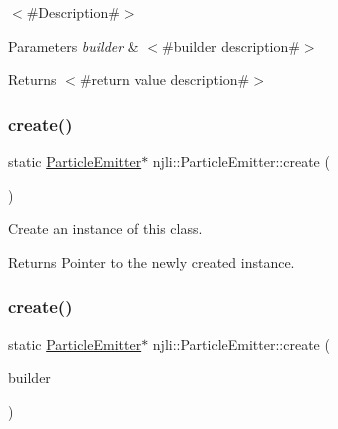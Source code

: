 $<$\#\+Description\#$>$


\begin{DoxyParams}{Parameters}
{\em builder} & $<$\#builder description\#$>$\\
\hline
\end{DoxyParams}
\begin{DoxyReturn}{Returns}
$<$\#return value description\#$>$ 
\end{DoxyReturn}
\mbox{\label{classnjli_1_1_particle_emitter_a08d13d496fe59ef6546eac4e56b3d45f}} 
\subsubsection{\texorpdfstring{create()}{create()}\hspace{0.1cm}{\footnotesize\ttfamily [2/3]}}
{\footnotesize\ttfamily static \mbox{\hyperlink{classnjli_1_1_particle_emitter}{Particle\+Emitter}}$\ast$ njli\+::\+Particle\+Emitter\+::create (\begin{DoxyParamCaption}{ }\end{DoxyParamCaption})\hspace{0.3cm}{\ttfamily [static]}}

Create an instance of this class.

\begin{DoxyReturn}{Returns}
Pointer to the newly created instance. 
\end{DoxyReturn}
\mbox{\label{classnjli_1_1_particle_emitter_a3c0e274cedf2f51c2bcd47a77f03bd0f}} 
\subsubsection{\texorpdfstring{create()}{create()}\hspace{0.1cm}{\footnotesize\ttfamily [3/3]}}
{\footnotesize\ttfamily static \mbox{\hyperlink{classnjli_1_1_particle_emitter}{Particle\+Emitter}}$\ast$ njli\+::\+Particle\+Emitter\+::create (\begin{DoxyParamCaption}\item[{const \mbox{\hyperlink{classnjli_1_1_particle_emitter_builder}{Particle\+Emitter\+Builder}} \&}]{builder }\end{DoxyParamCaption})\hspace{0.3cm}{\ttfamily [static]}}

